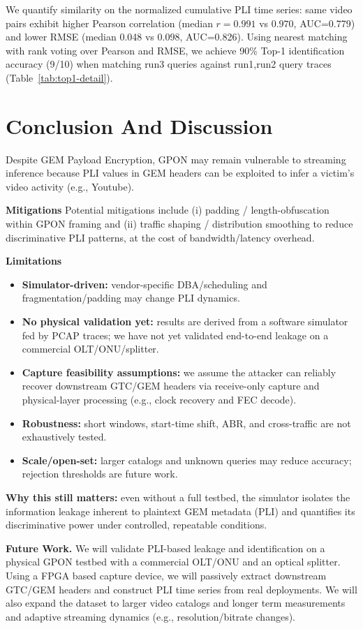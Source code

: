 \documentclass[sigconf,anonymous]{acmart}
\begin{document}
We quantify similarity on the normalized cumulative PLI time series: same video pairs exhibit higher Pearson correlation (median $r=0.991$ vs $0.970$, AUC=0.779) and lower RMSE (median 0.048 vs 0.098, AUC=0.826).
Using nearest matching with rank voting over Pearson and RMSE, we achieve 90\% Top-1 identification accuracy (9/10) when matching run3 queries against run1,run2 query traces (Table~\ref{tab:top1-detail}).

\section{Conclusion And Discussion}
Despite GEM Payload Encryption, GPON may remain vulnerable to streaming inference because PLI values in GEM headers can be exploited to infer a victim’s video activity (e.g., Youtube). 

\textbf{Mitigations} Potential mitigations include (i) padding / length-obfuscation within GPON framing and (ii) traffic shaping / distribution smoothing to reduce discriminative PLI patterns, at the cost of bandwidth/latency overhead. 

\textbf{Limitations} 
\begin{itemize}
  \item \textbf{Simulator-driven:} vendor-specific DBA/scheduling and fragmentation/padding may change PLI dynamics.
  \item \textbf{No physical validation yet:} results are derived from a software simulator fed by PCAP traces; we have not yet validated end-to-end leakage on a commercial OLT/ONU/splitter.
  \item \textbf{Capture feasibility assumptions:} we assume the attacker can reliably recover downstream GTC/GEM headers via receive-only capture and physical-layer processing (e.g., clock recovery and FEC decode).
  \item \textbf{Robustness:} short windows, start-time shift, ABR, and cross-traffic are not exhaustively tested.
  \item \textbf{Scale/open-set:} larger catalogs and unknown queries may reduce accuracy; rejection thresholds are future work.
\end{itemize}
\noindent\textbf{Why this still matters:} even without a full testbed, the simulator isolates the information leakage inherent to plaintext GEM metadata (PLI) and quantifies its discriminative power under controlled, repeatable conditions.

\textbf{Future Work.}
We will validate PLI-based leakage and identification on a physical GPON testbed with a commercial OLT/ONU and an optical splitter.
Using a FPGA based capture device, we will passively extract downstream GTC/GEM headers and construct PLI time series from real deployments.
We will also expand the dataset to larger video catalogs and longer term measurements and adaptive streaming dynamics (e.g., resolution/bitrate changes). 
\end{document}
